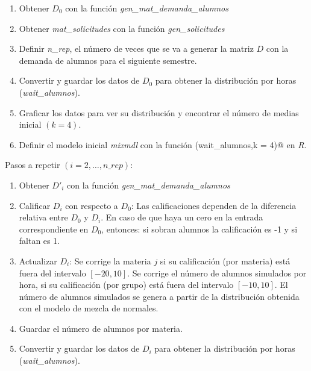 \begin{enumerate}
\item Obtener $D_{0}$ con la función \textit{gen\_mat\_demanda\_alumnos}

\item Obtener \textit{mat\_solicitudes} con la función \textit{gen\_solicitudes}

\item Definir \textit{n\_rep}, el número de veces que se va a generar la matriz $D$ con la demanda de alumnos para el siguiente semestre.

\item Convertir y guardar los datos de $D_{0}$ para obtener la distribución por horas (\textit{wait\_alumnos}).

\item Graficar los datos para ver su distribución y encontrar el número de medias inicial $(k = 4)$.

\item Definir el modelo inicial \textit{mixmdl} con la función \verb@normalmixEM(wait_alumnos,k = 4)@ en \textit{R}.
\end{enumerate}

Pasos a repetir $(i = 2, \ldots, \textit{n\_rep})$:

\begin{enumerate}
\item Obtener $D'_{i}$ con la función \textit{gen\_mat\_demanda\_alumnos}

\item Calificar $D_{i}$ con respecto a $D_{0}$: Las calificaciones dependen de la diferencia relativa entre $D_{0}$ y $D_{i}$. En caso de que haya un cero en la entrada correspondiente en $D_{0}$, entonces: si sobran alumnos la calificación es -1 y si faltan es 1.

\item Actualizar $D_{i}$: Se corrige la materia $j$ si su calificación (por materia) está fuera del intervalo $[-20,10]$. Se corrige el número de alumnos simulados por hora, si su calificación (por grupo) está fuera del intervalo $[-10,10]$. El número de alumnos simulados se genera a partir de la distribución obtenida con el modelo de mezcla de normales.

\item Guardar el número de alumnos por materia.

\item Convertir y guardar los datos de $D_{i}$ para obtener la distribución por horas (\textit{wait\_alumnos}).
\end{enumerate}

